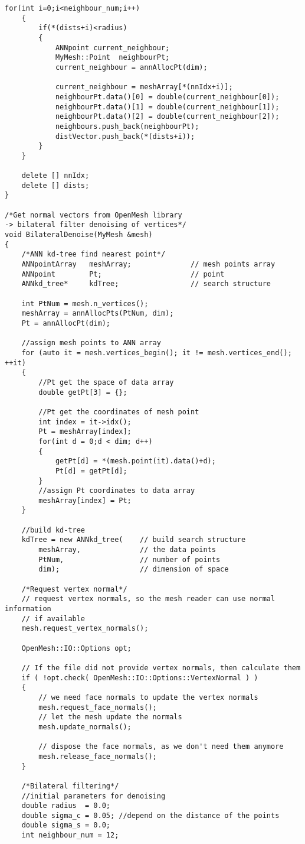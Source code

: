 \begin{enumerate}[1.]
\begin{lstlisting}[xleftmargin=0em]
	for(int i=0;i<neighbour_num;i++)
	{
		if(*(dists+i)<radius)
		{
			ANNpoint current_neighbour;
			MyMesh::Point  neighbourPt;
			current_neighbour = annAllocPt(dim);

			current_neighbour = meshArray[*(nnIdx+i)];
			neighbourPt.data()[0] = double(current_neighbour[0]);
			neighbourPt.data()[1] = double(current_neighbour[1]);
			neighbourPt.data()[2] = double(current_neighbour[2]);
			neighbours.push_back(neighbourPt);
			distVector.push_back(*(dists+i));
		}
	}

	delete [] nnIdx; 
	delete [] dists;
}

/*Get normal vectors from OpenMesh library
-> bilateral filter denoising of vertices*/
void BilateralDenoise(MyMesh &mesh)
{
	/*ANN kd-tree find nearest point*/
	ANNpointArray	meshArray;				// mesh points array
	ANNpoint		Pt;						// point
	ANNkd_tree*		kdTree;					// search structure

	int PtNum = mesh.n_vertices();
	meshArray = annAllocPts(PtNum, dim);
	Pt = annAllocPt(dim);

	//assign mesh points to ANN array
	for (auto it = mesh.vertices_begin(); it != mesh.vertices_end(); ++it)
	{   
		//Pt get the space of data array
		double getPt[3] = {};

		//Pt get the coordinates of mesh point
		int index = it->idx();
		Pt = meshArray[index];
		for(int d = 0;d < dim; d++)
		{
			getPt[d] = *(mesh.point(it).data()+d);
			Pt[d] = getPt[d];
		}
		//assign Pt coordinates to data array
		meshArray[index] = Pt;
	}

	//build kd-tree
	kdTree = new ANNkd_tree(	// build search structure
		meshArray,				// the data points
		PtNum,					// number of points
		dim);					// dimension of space

	/*Request vertex normal*/
	// request vertex normals, so the mesh reader can use normal information
	// if available
	mesh.request_vertex_normals();

	OpenMesh::IO::Options opt;

	// If the file did not provide vertex normals, then calculate them
	if ( !opt.check( OpenMesh::IO::Options::VertexNormal ) )
	{
		// we need face normals to update the vertex normals
		mesh.request_face_normals();
		// let the mesh update the normals
		mesh.update_normals();

		// dispose the face normals, as we don't need them anymore
		mesh.release_face_normals();
	}

	/*Bilateral filtering*/
	//initial parameters for denoising
	double radius  = 0.0;
	double sigma_c = 0.05; //depend on the distance of the points
	double sigma_s = 0.0;
	int neighbour_num = 12;


\end{lstlisting}
\end{enumerate}
